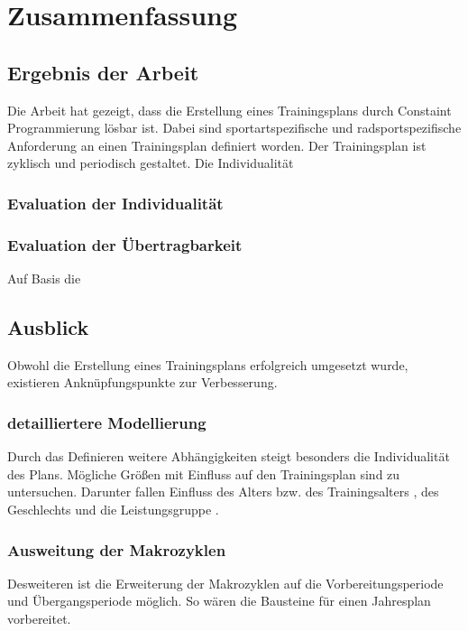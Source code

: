 \chapter{Zusammenfassung}
\label{sec:zusammenfassung}
\section{Ergebnis der Arbeit}
\label{sec:zusammenfassung:ergebnis}
Die Arbeit hat gezeigt, dass die Erstellung eines Trainingsplans durch Constaint Programmierung lösbar ist. Dabei sind sportartspezifische und radsportspezifische Anforderung an einen Trainingsplan definiert worden. Der Trainingsplan ist zyklisch und periodisch gestaltet.
Die Individualität 
\subsection{Evaluation der Individualität}
\subsection{Evaluation der Übertragbarkeit}
Auf Basis die

\section{Ausblick}
\label{sec:zusammenfassung:ausblick}
Obwohl die Erstellung eines Trainingsplans erfolgreich umgesetzt wurde, existieren Anknüpfungspunkte zur Verbesserung. \newline

\subsection{detailliertere Modellierung} Durch das Definieren weitere Abhängigkeiten steigt besonders die Individualität des Plans. Mögliche Größen mit Einfluss auf den Trainingsplan sind zu untersuchen. Darunter fallen Einfluss des Alters bzw. des Trainingsalters \cite[181]{EinfuerungTrainingswissenschaft}, des Geschlechts und die Leistungsgruppe \cite[S. 173]{Radsporttraining}.
   
\subsection{Ausweitung der Makrozyklen} 
Desweiteren ist die Erweiterung der Makrozyklen auf die Vorbereitungsperiode und Übergangsperiode möglich. So wären die Bausteine für einen Jahresplan vorbereitet. 

